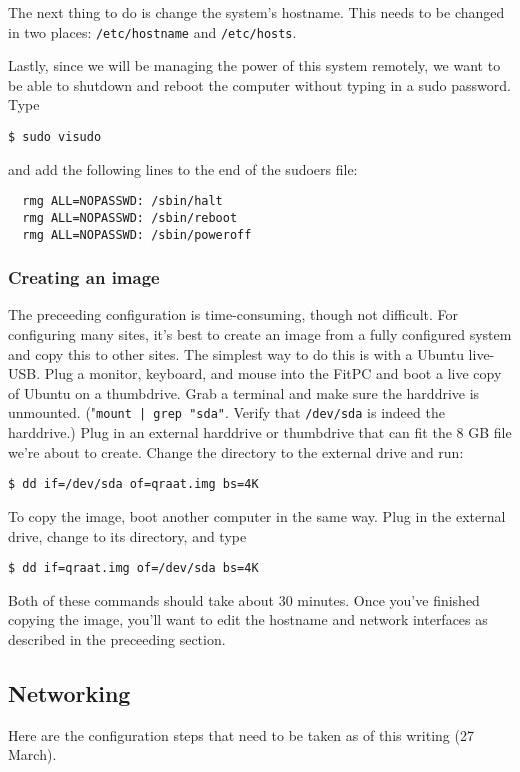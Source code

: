 \documentclass[letter]{article}
\begin{document}
The next thing to do is change the system's hostname. This needs to be changed in two places:
\texttt{/etc/hostname} and \texttt{/etc/hosts}. 

Lastly, since we will be managing the power of this system remotely, we want to be able to 
shutdown and reboot the computer without typing in a sudo password. Type 
\begin{verbatim}
$ sudo visudo
\end{verbatim}
and add the following lines to the end of the sudoers file: 
\begin{verbatim}
  rmg ALL=NOPASSWD: /sbin/halt
  rmg ALL=NOPASSWD: /sbin/reboot
  rmg ALL=NOPASSWD: /sbin/poweroff
\end{verbatim}

\subsubsection{Creating an image}
The preceeding configuration is time-consuming, though not difficult. For configuring many sites, 
it's best to create an image from a fully configured system and copy this to other sites. The 
simplest way to do this is with a Ubuntu live-USB. Plug a monitor, keyboard, and mouse into the 
FitPC and boot a live copy of Ubuntu on a thumbdrive. Grab a terminal and make sure the harddrive
is unmounted. ("\texttt{mount | grep "sda"}. Verify that \texttt{/dev/sda} is indeed the 
harddrive.) Plug in an external harddrive or thumbdrive that can 
fit the 8 GB file we're about to create. Change the directory to the external drive and run: 
\begin{verbatim}
$ dd if=/dev/sda of=qraat.img bs=4K 
\end{verbatim}
To copy the image, boot another computer in the same way. Plug in the external drive, change to 
its directory, and type
\begin{verbatim}
$ dd if=qraat.img of=/dev/sda bs=4K
\end{verbatim}

Both of these commands should take about 30 minutes. Once you've finished copying the image, you'll 
want to edit the hostname and network interfaces as described in the preceeding section.  



\subsection{Networking}
Here are the configuration steps that need to be taken as of this writing (27 March).
\end{document}
